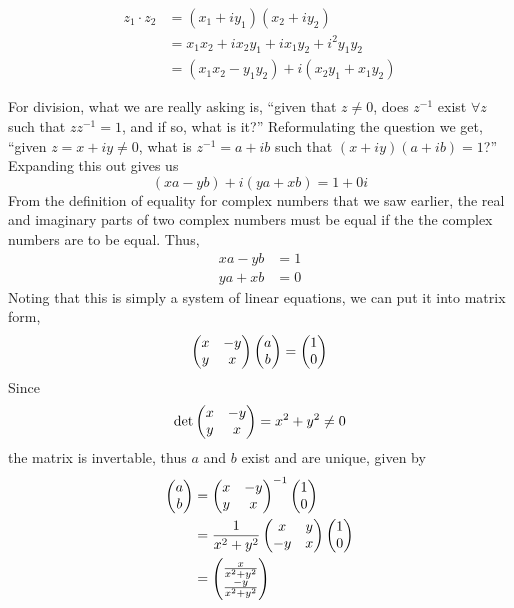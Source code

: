 \documentclass[10pt]{scrartcl}
\numberwithin{equation}{subsection}
\theoremstyle{definition}
\theoremstyle{remark}
\newcommand{\inv}[1]{
		{#1}^{-1}
	}
\begin{document}
\begin{align*}
	z_1 \cdot z_2 &= (x_1 + i y_1)(x_2+ i y_2)\\
	       &= x_1 x_2 + i x_2 y_1 + i x_1 y_2 + i^2 y_1 y_2\\
	&= (x_1 x_2 - y_1 y_2) + i(x_2 y_1 + x_1 y_2)
\end{align*}

For division, what we are really asking is, 
``given that $z \neq 0$, does $\inv{z}$ exist $\forall z$ such that $z \inv{z} = 1$, and if so, what is it?'' 
Reformulating the question we get,
``given $z = x + iy \neq 0$, what is $\inv{z} = a + ib$ such that $(x+iy)(a+ib) = 1$?''
Expanding this out gives us
\[
	(xa - yb) + i(ya + xb) = 1 + 0i
\]
From the definition of equality for complex numbers that we saw earlier,
the real and imaginary parts of two complex numbers must be equal if the the
complex numbers are to be equal. Thus,
\begin{align*}
	xa - yb &= 1 \\
	ya + xb &= 0
\end{align*}
Noting that this is simply a system of linear equations, we can put it into
matrix form,
\[
	\pmqty{x & -y \\ y & x} \pmqty{a \\ b} = \pmqty{1 \\ 0}
\]
Since 
\[
	\det \pmqty{x & -y \\ y & x}  = x^2 + y^2 \neq 0
\]
the matrix is invertable, thus $a$ and $b$ exist and are unique, given by
\begin{align*}
	\pmqty{a \\ b} &= \inv{\pmqty{x & -y \\ y & x}} \pmqty{1 \\ 0} \\
		&= \frac{1}{x^2 + y^2} \pmqty{x & y \\ -y & x } \pmqty{1 \\ 0} \\
  &= \pmqty{\frac{x}{x^2+y^2} \\ \frac{-y}{x^2+y^2}} \\
\end{align*}
\end{document}
